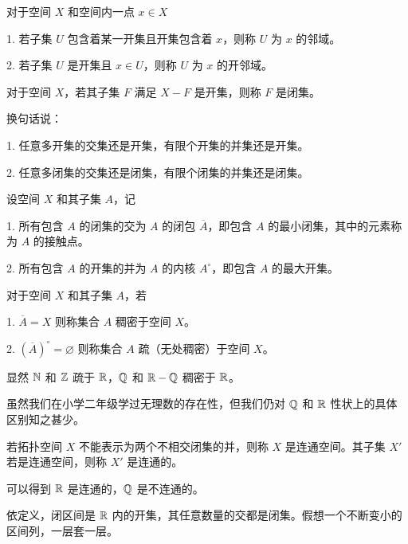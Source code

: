\begin{definition}[邻域]
	对于空间 $X$ 和空间内一点 $x \in X$

	1. 若子集 $U$ 包含着某一开集且开集包含着 $x$，则称 $U$ 为 $x$ 的邻域。

	2. 若子集 $U$ 是开集且 $x \in U$，则称 $U$ 为 $x$ 的开邻域。
\end{definition}

\begin{definition}[闭集]
	对于空间 $X$，若其子集 $F$ 满足 $X-F$ 是开集，则称 $F$ 是闭集。
\end{definition}

\begin{example}
	换句话说：

	1. 任意多开集的交集还是开集，有限个开集的并集还是开集。

	2. 任意多闭集的交集还是闭集，有限个闭集的并集还是闭集。
\end{example}

\begin{definition}[闭包，内核]
	设空间 $X$ 和其子集 $A$，记

	1. 所有包含 $A$ 的闭集的交为 $A$ 的闭包 $\overline{A}$，即包含 $A$ 的最小闭集，其中的元素称为 $A$ 的接触点。

	2. 所有包含 $A$ 的开集的并为 $A$ 的内核 $A^{\circ}$，即包含 $A$ 的最大开集。
\end{definition}

\begin{definition}
	对于空间 $X$ 和其子集 $A$，若

	1. $\overline{A} = X$ 则称集合 $A$ 稠密于空间 $X$。

	2. $(\overline{A})^{\circ} = \varnothing$ 则称集合 $A$ 疏（无处稠密）于空间 $X$。
\end{definition}

显然 $\mathbb{N}$ 和 $\mathbb{Z}$ 疏于 $\mathbb{R}$，$\mathbb{Q}$ 和 $\mathbb{R} - \mathbb{Q}$ 稠密于 $\mathbb{R}$。

虽然我们在小学二年级学过无理数的存在性，但我们仍对 $\mathbb{Q}$ 和 $\mathbb{R}$ 性状上的具体区别知之甚少。

\begin{definition}[连通]
	若拓扑空间 $X$ 不能表示为两个不相交闭集的并，则称 $X$ 是连通空间。其子集 $X'$ 若是连通空间，则称 $X'$ 是连通的。
\end{definition}

可以得到 $\mathbb{R}$ 是连通的，$\mathbb{Q}$ 是不连通的。

依定义，闭区间是 $\mathbb{R}$ 内的开集，其任意数量的交都是闭集。假想一个不断变小的区间列，一层套一层。

